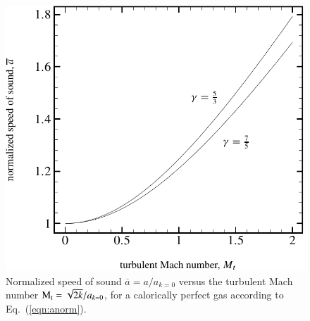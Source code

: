 %
\begin{figure}
   \includegraphics[width=3.36\lengthfigure]{fig3/ParentFig1.pdf}
\caption{Normalized speed of sound $\overline{a}=a/a_{k=0}$
         versus the turbulent Mach number ${\rm M}_{\rm t}=\sqrt{2k}/a_{k=0}$,
         for a calorically perfect gas according to
         Eq.~(\ref{eqn:anorm}).}
\label{fig:anorm-Mturb}
\end{figure}
%

